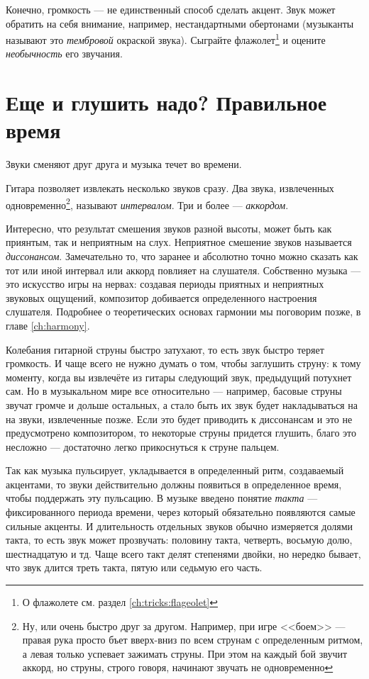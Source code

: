 Конечно, громкость --- не единственный способ сделать акцент. Звук может обратить на себя внимание, например, нестандартными обертонами (музыканты называют это \emph{тембровой} окраской звука). Сыграйте флажолет\footnote{О флажолете см. раздел \ref{ch:tricks:flageolet}} и оцените \emph{необычность} его звучания.


\section{Еще и глушить надо? Правильное время}
\label{ch:music:rythm}

Звуки сменяют друг друга и музыка течет во времени. 

Гитара позволяет извлекать несколько звуков сразу. Два звука, извлеченных одновременно\footnote{Ну, или очень быстро друг за другом. Например, при игре <<боем>> --- правая рука просто бъет вверх-вниз по всем струнам с определенным ритмом, а левая только успевает зажимать струны. При этом на каждый бой звучит аккорд, но струны, строго говоря, начинают звучать не одновременно}, называют \emph{интервалом}. Три и более --- \emph{аккордом}.

Интересно, что результат смешения звуков разной высоты, может быть как приянтым, так и неприятным на слух. Неприятное смешение звуков называется \emph{диссонансом}. Замечательно то, что заранее и абсолютно точно можно сказать как тот или иной интервал или аккорд повлияет на слушателя. Собственно музыка --- это искусство игры на нервах: создавая периоды приятных и неприятных звуковых ощущений, композитор добивается определенного настроения слушателя. Подробнее о теоретических основах гармонии мы поговорим позже, в главе \ref{ch:harmony}.

Колебания гитарной струны быстро затухают, то есть звук быстро теряет громкость. И чаще всего не нужно думать о том, чтобы заглушить струну: к тому моменту, когда вы извлечёте из гитары следующий звук, предыдущий потухнет сам. Но в музыкальном мире все относительно --- например, басовые струны звучат громче и дольше остальных, а стало быть их звук будет накладываться на на звуки, извлеченные позже. Если это будет приводить к диссонансам и это не предусмотрено композитором, то некоторые струны придется глушить, благо это несложно --- достаточно легко прикоснуться к струне пальцем.

Так как музыка пульсирует, укладывается в определенный ритм, создаваемый акцентами, то звуки действительно должны появиться в определенное время, чтобы поддержать эту пульсацию. В музыке введено понятие \emph{такта} --- фиксированного периода времени, через который обязательно появляются самые сильные акценты. И длительность отдельных звуков обычно измеряется долями такта, то есть звук может прозвучать: половину такта, четверть, восьмую долю, шестнадцатую и тд. Чаще всего такт делят степенями двойки, но нередко бывает, что звук длится треть такта, пятую или седьмую его часть.

